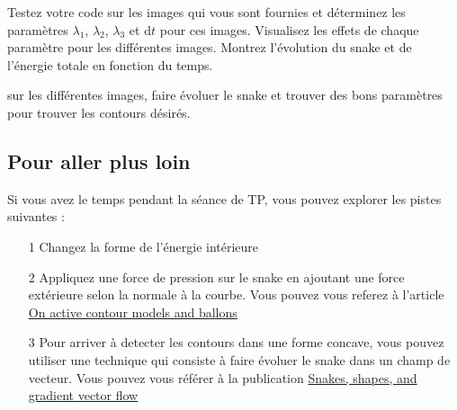 \documentclass[10pt,a4paper]{article}
\begin{document}
Testez votre code sur les images qui vous sont fournies et d\'{e}terminez les param\`{e}tres $\lambda_1$, $\lambda_2$, $\lambda_3$ et $\mathrm{d}t$ pour ces images. Visualisez les effets de chaque param\`{e}tre pour les diff\'{e}rentes images. Montrez l'\'{e}volution du snake et de l'\'{e}nergie totale en fonction du temps.

sur les diff\'{e}rentes images, faire \'{e}voluer le snake et trouver des bons param\`{e}tres pour trouver les contours d\'{e}sir\'{e}s.

\subsection{Pour aller plus loin}
Si vous avez le temps pendant la s\'{e}ance de TP, vous pouvez explorer les pistes suivantes : 
\begin{itemize}
	\item[1] Changez la forme de l'\'{e}nergie int\'{e}rieure
	\item[2] Appliquez une force de pression sur le snake en ajoutant une force ext\'{e}rieure selon la normale \`{a} la courbe. Vous pouvez vous referez \`{a} l'article \href{http://ac.els-cdn.com/104996609190028N/1-s2.0-104996609190028N-main.pdf?_tid=8cc41376-c1ff-11e4-a8e9-00000aab0f26&acdnat=1425426585_a1dae6c4928c4fa3bc99d9bffe5d920c}{On active contour models and ballons}
	\item[3] Pour arriver \`{a} detecter les contours dans une forme concave, vous pouvez utiliser une technique qui consiste \`{a} faire \'{e}voluer le snake dans un champ de vecteur. Vous pouvez vous r\'{e}f\'{e}rer \`{a} la publication \href{http://www-artemis.it-sudparis.eu/~rougon/IMA4509/Controle/Sujets/Xu-IP-1998.pdf}{Snakes, shapes, and gradient vector flow}
\end{itemize}
\end{document}
